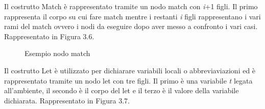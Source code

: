 \documentclass[12pt,a4paper,openright,twoside]{report}
\begin{document}
Il costrutto Match \`e rappresentato tramite un nodo match con \textit{i}+1 figli. Il primo rappresenta il corpo su cui fare match mentre i restanti \textit{i} figli rappresentano i vari rami del match ovvero i nodi da eseguire dopo aver messo a confronto i vari casi. Rappresentato in Figura 3.6.\newline

\begin{figure}[h]
\begin{center}
\caption[]{Esempio nodo match}\label{fig:prima}
\end{center}
\end{figure}

Il costrutto Let \`e utilizzato per dichiarare variabili locali o abbreviaviazioni ed \`e rappresentato tramite un nodo let con tre figli. Il primo \`e una variabile \textit{t} legata all'ambiente, il secondo \`e il corpo del let e il terzo \`e il valore della variabile dichiarata. Rappresentato in Figura 3.7.\newline
\end{document}
